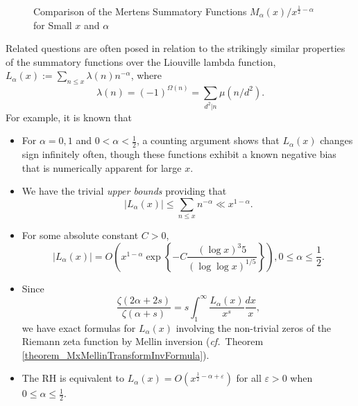 \documentclass[11pt,reqno,a4letter]{article}
\numberwithin{figure}{section}
\numberwithin{table}{section}
\newcommand{\cf}{\textit{cf.\ }}
\theoremstyle{plain}
\numberwithin{theorem}{section}
\theoremstyle{definition}
\begin{document}
\begin{figure}[ht!] 

\begin{minipage}{\textwidth} 
\begin{center}
\end{center} 
\end{minipage} 

\bigskip

\begin{minipage}{\textwidth} 
\begin{center}
\end{center}
\end{minipage} 

\caption{Comparison of the Mertens Summatory Functions $M_{\alpha}(x) / x^{\frac{1}{2}-\alpha}$ 
         for Small $x$ and $\alpha$} 
\label{figure_MertensSummatoryFns_init_plots} 

\end{figure} 

Related questions are often posed in relation to the strikingly 
similar properties of the 
summatory functions over the Liouville lambda function, 
$L_{\alpha}(x) := \sum_{n \leq x} \lambda(n) n^{-\alpha}$, where 
$$\lambda(n) = (-1)^{\Omega(n)} = \sum_{d^2|n} \mu(n/d^2).$$  
For example, it is known that \cite{JNT-HUMPHRIES-2013} 
\begin{itemize} 
     \item For $\alpha = 0, 1$ and $0 < \alpha < \frac{1}{2}$, a counting argument shows that 
     $L_{\alpha}(x)$ changes sign infinitely often, though these functions exhibit a known 
     negative bias that is numerically apparent for large $x$. 
     \item We have the trivial \emph{upper bounds} providing that 
     \[
     |L_{\alpha}(x)| \leq \sum_{n \leq x} n^{-\alpha} \ll x^{1-\alpha}. 
     \]
     \item For some absolute constant $C > 0$, 
     \[
     |L_{\alpha}(x)| = O\left(x^{1-\alpha} \exp\left\{-C \frac{(\log x)^{3}{5}}{(\log\log x)^{1/5}} 
          \right\}\right), 0 \leq \alpha \leq \frac{1}{2}. 
     \]
     \item Since 
     \[
     \frac{\zeta(2\alpha+2s)}{\zeta(\alpha+s)} = s \int_1^{\infty} \frac{L_{\alpha}(x)}{x^s} \frac{dx}{x}, 
     \]
     we have exact formulas for $L_{\alpha}(x)$ involving the non-trivial zeros of the 
     Riemann zeta function by Mellin inversion (\cf Theorem \ref{theorem_MxMellinTransformInvFormula}).  
     \item The RH is equivalent to $L_{\alpha}(x) = O(x^{\frac{1}{2}-\alpha+\varepsilon})$ for all 
           $\varepsilon > 0$ when $0 \leq \alpha \leq \frac{1}{2}$. 
\end{itemize} 
\end{document}

